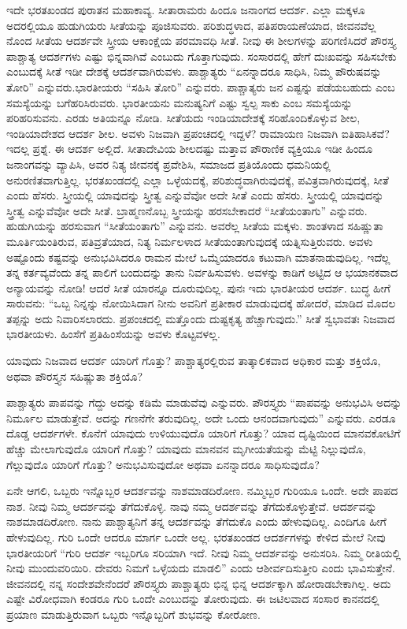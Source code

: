 ಇದೇ ಭರತಖಂಡದ ಪುರಾತನ ಮಹಾಕಾವ್ಯ. ಸೀತಾರಾಮರು ಹಿಂದೂ ಜನಾಂಗದ ಆದರ್ಶ. ಎಲ್ಲಾ ಮಕ್ಕಳೂ ಅದರಲ್ಲಿಯೂ ಹುಡುಗಿಯರು ಸೀತೆಯನ್ನು ಪೂಜಿಸುವರು. ಪರಿಶುದ್ಧಳಾದ, ಪತಿಪರಾಯಣೆಯಾದ, ಜೀವನವೆಲ್ಲ ನೊಂದ ಸೀತೆಯ ಆದರ್ಶವೇ ಸ್ತ್ರೀಯ ಆಕಾಂಕ್ಷೆಯ ಪರಮಾವಧಿ ಸೀತೆ. ನೀವು ಈ ಶೀಲಗಳನ್ನು ಪರಿಗಣಿಸಿದರೆ ಪೌರಸ್ತ್ಯ ಪಾಶ್ಚಾತ್ಯ ಆದರ್ಶಗಳು ಎಷ್ಟು ಭಿನ್ನವಾಗಿವೆ ಎಂಬುದು ಗೊತ್ತಾಗುವುದು. ಸಂಸಾರದಲ್ಲಿ ಹೇಗೆ ದುಃಖವನ್ನು ಸಹಿಸಬೇಕು ಎಂಬುದಕ್ಕೆ ಸೀತೆ ಇಡೀ ದೇಶಕ್ಕೆ ಆದರ್ಶವಾಗಿರುವಳು. ಪಾಶ್ಚಾತ್ಯರು “ಏನನ್ನಾದರೂ ಸಾಧಿಸಿ, ನಿಮ್ಮ ಪೌರುಷವನ್ನು ತೋರಿ” ಎನ್ನುವರು.\break ಭಾರತೀಯರು “ಸಹಿಸಿ ತೋರಿ” ಎನ್ನುವರು. ಪಾಶ್ಚಾತ್ಯರು ಜನ ಎಷ್ಟನ್ನು ಪಡೆಯಬಹುದು ಎಂಬ ಸಮಸ್ಯೆಯನ್ನು ಬಗೆಹರಿಸಿರುವರು. ಭಾರತೀಯನು ಮನುಷ್ಯನಿಗೆ ಎಷ್ಟು ಸ್ವಲ್ಪ ಸಾಕು ಎಂಬ ಸಮಸ್ಯೆಯನ್ನು ಪರಿಹರಿಸುವನು. ಎರಡು ಅತಿಯನ್ನೂ ನೋಡಿ. ಸೀತೆಯದು ಇಂಡಿಯಾದೇಶಕ್ಕೆ ಸರಿಹೊಂದಿಕೊಳ್ಳುವ ಶೀಲ, ಇಂಡಿಯಾದೇಶದ ಆದರ್ಶ ಶೀಲ. ಅವಳು ನಿಜವಾಗಿ ಪ್ರಪಂಚದಲ್ಲಿ ಇದ್ದಳೆ? ರಾಮಾಯಣ ನಿಜವಾಗಿ ಐತಿಹಾಸಿಕವೆ? ಇದಲ್ಲ ಪ್ರಶ್ನೆ. ಈ ಆದರ್ಶ ಅಲ್ಲಿದೆ. ಸೀತಾದೇವಿಯ ಶೀಲದಷ್ಟು ಮತ್ತಾವ ಪೌರಾಣಿಕ ವ್ಯಕ್ತಿಯೂ ಇಡೀ ಹಿಂದೂ ಜನಾಂಗವನ್ನು ವ್ಯಾಪಿಸಿ, ಅವರ ನಿತ್ಯ ಜೀವನಕ್ಕೆ ಪ್ರವೇಶಿಸಿ, ಸಮಾಜದ ಪ್ರತಿಯೊಂದು ಧಮನಿಯಲ್ಲಿ ಅನುರಣಿತವಾಗುತ್ತಿಲ್ಲ. ಭರತಖಂಡದಲ್ಲಿ ಎಲ್ಲಾ ಒಳ್ಳೆಯದಕ್ಕೆ, ಪರಿಶುದ್ಧವಾಗಿರುವುದಕ್ಕೆ, ಪವಿತ್ರವಾಗಿರುವುದಕ್ಕೆ, ಸೀತೆ ಎಂದು ಹೆಸರು. ಸ್ತ್ರೀಯಲ್ಲಿ ಯಾವುದನ್ನು ಸ್ತ್ರೀತ್ವ ಎನ್ನುವೆವೋ ಅದೇ ಸೀತೆ ಎಂದು ಹೆಸರು. ಸ್ತ್ರೀಯಲ್ಲಿ ಯಾವುದನ್ನು ಸ್ತ್ರೀತ್ವ ಎನ್ನುವೆವೋ ಅದೇ ಸೀತೆ. ಬ್ರಾಹ್ಮಣನೊಬ್ಬ ಸ್ತ್ರೀಯನ್ನು ಹರಸಬೇಕಾದರೆ “ಸೀತೆಯಂತಾಗು” ಎನ್ನುವರು. ಹುಡುಗಿಯನ್ನು ಹರಸುವಾಗ “ಸೀತೆಯಂತಾಗು” ಎನ್ನುವನು. ಅವರೆಲ್ಲ ಸೀತೆಯ ಮಕ್ಕಳು. ಶಾಂತಳಾದ ಸಹಿಷ್ಣುತಾ ಮೂರ್ತಿಯಂತಿರುವ, ಪತಿವ್ರತೆಯಾದ, ನಿತ್ಯ ನಿರ್ಮಲಳಾದ ಸೀತೆಯಂತಾಗುವುದಕ್ಕೆ ಯತ್ನಿಸುತ್ತಿರುವರು. ಅವಳು ಅಷ್ಟೊಂದು ಕಷ್ಟವನ್ನು ಅನುಭವಿಸಿದರೂ ರಾಮನ ಮೇಲೆ ಒಮ್ಮೆಯಾದರೂ ಕಟುವಾಗಿ ಮಾತನಾಡುವುದಿಲ್ಲ. ಇದೆಲ್ಲ ತನ್ನ ಕರ್ತವ್ಯವೆಂದು ತನ್ನ ಪಾಲಿಗೆ ಬಂದುದನ್ನು ತಾನು ನಿರ್ವಹಿಸುವಳು. ಅವಳನ್ನು ಕಾಡಿಗೆ ಅಟ್ಟಿದ ಆ ಭಯಾನಕವಾದ ಅನ್ಯಾಯವನ್ನು ನೋಡಿ! ಆದರೆ ಸೀತೆ ಯಾರನ್ನೂ ದೂರುವುದಿಲ್ಲ. ಪುನಃ ಇದು ಭಾರತೀಯರ ಆದರ್ಶ. ಬುದ್ಧ ಹೀಗೆ ಸಾರುವನು: “ಒಬ್ಬ ನಿನ್ನನ್ನು ನೋಯಿಸಿದಾಗ ನೀನು ಅವನಿಗೆ ಪ್ರತೀಕಾರ ಮಾಡುವುದಕ್ಕೆ ಹೋದರೆ, ಮಾಡಿದ ಮೊದಲ ತಪ್ಪನ್ನು ಅದು ನಿವಾರಿಸಲಾರದು. ಪ್ರಪಂಚದಲ್ಲಿ ಮತ್ತೊಂದು ದುಷ್ಟಕೃತ್ಯ ಹೆಚ್ಚಾಗುವುದು.” ಸೀತೆ ಸ್ವಭಾವತಃ ನಿಜವಾದ ಭಾರತೀಯಳು. ಹಿಂಸೆಗೆ ಪ್ರತಿಹಿಂಸೆಯನ್ನು ಅವಳು ಕೊಟ್ಟವಳಲ್ಲ.

ಯಾವುದು ನಿಜವಾದ ಆದರ್ಶ ಯಾರಿಗೆ ಗೊತ್ತು? ಪಾಶ್ಚಾತ್ಯರಲ್ಲಿರುವ ತಾತ್ಕಾಲಿಕವಾದ ಅಧಿಕಾರ ಮತ್ತು ಶಕ್ತಿಯೊ, ಅಥವಾ ಪೌರಸ್ತ್ಯನ ಸಹಿಷ್ಣುತಾ ಶಕ್ತಿಯೊ?

ಪಾಶ್ಚಾತ್ಯರು ಪಾಪವನ್ನು ಗೆದ್ದು ಅದನ್ನು ಕಡಿಮೆ ಮಾಡುವೆವು ಎನ್ನುವರು. ಪೌರಸ್ತ್ಯರು “ಪಾಪವನ್ನು ಅನುಭವಿಸಿ ಅದನ್ನು ನಿರ್ಮೂಲ ಮಾಡುತ್ತೇವೆ. ಅದನ್ನು ಗಣನೆಗೇ ತರುವುದಿಲ್ಲ. ಅದೇ ಒಂದು ಆನಂದವಾಗುವುದು” ಎನ್ನುವರು. ಎರಡೂ ದೊಡ್ಡ ಆದರ್ಶಗಳೇ. ಕೊನೆಗೆ ಯಾವುದು ಉಳಿಯುವುದೊ ಯಾರಿಗೆ ಗೊತ್ತು? ಯಾವ ದೃಷ್ಟಿಯಿಂದ ಮಾನವಕೋಟಿಗೆ ಹೆಚ್ಚು ಮೇಲಾಗುವುದೊ ಯಾರಿಗೆ ಗೊತ್ತು? ಯಾವುದು ಮಾನವನ ಮೃಗೀಯತೆಯನ್ನು ಮೆಟ್ಟಿ ನಿಲ್ಲುವುದೊ, ಗೆಲ್ಲುವುದೊ ಯಾರಿಗೆ ಗೊತ್ತು? ಅನುಭವಿಸುವುದೋ ಅಥವಾ ಏನನ್ನಾದರೂ ಸಾಧಿಸುವುದೊ?

ಏನೇ ಆಗಲಿ, ಒಬ್ಬರು ಇನ್ನೊಬ್ಬರ ಆದರ್ಶವನ್ನು ನಾಶಮಾಡದಿರೋಣ. ನಮ್ಮಿಬ್ಬರ ಗುರಿಯೂ ಒಂದೇ. ಅದೇ ಪಾಪದ ನಾಶ. ನೀವು ನಿಮ್ಮ ಆದರ್ಶವನ್ನು ತೆಗೆದುಕೊಳ್ಳಿ. ನಾವು ನಮ್ಮ ಆದರ್ಶವನ್ನು ತೆಗೆದುಕೊಳ್ಳುತ್ತೇವೆ. ಆದರ್ಶವನ್ನು ನಾಶಮಾಡದಿರೋಣ. ನಾನು ಪಾಶ್ಚಾತ್ಯನಿಗೆ ತನ್ನ ಆದರ್ಶವನ್ನು ತೆಗೆದುಕೊ ಎಂದು ಹೇಳುವುದಿಲ್ಲ. ಎಂದಿಗೂ ಹೀಗೆ ಹೇಳುವುದಿಲ್ಲ. ಗುರಿ ಒಂದೇ ಆದರೂ ಮಾರ್ಗ ಒಂದೇ ಅಲ್ಲ. ಭರತಖಂಡದ ಆದರ್ಶಗಳನ್ನು ಕೇಳಿದ ಮೇಲೆ ನೀವು ಭಾರತೀಯರಿಗೆ “ಗುರಿ ಆದರ್ಶ ಇಬ್ಬರಿಗೂ ಸರಿಯಾಗಿ ಇದೆ. ನೀವು ನಿಮ್ಮ ಆದರ್ಶವನ್ನು ಅನುಸರಿಸಿ. ನಿಮ್ಮ ರೀತಿಯಲ್ಲಿ ನೀವು ಮುಂದುವರಿಯಿರಿ. ದೇವರು ನಿಮಗೆ ಒಳ್ಳೆಯದು ಮಾಡಲಿ” ಎಂದು ಆಶೀರ್ವದಿಸುತ್ತೀರಿ ಎಂದು ಭಾವಿಸುತ್ತೇನೆ. ಜೀವನದಲ್ಲಿ ನನ್ನ ಸಂದೇಶವೇನೆಂದರೆ ಪೌರಸ್ತ್ಯರು ಪಾಶ್ಚಾತ್ಯರು ಭಿನ್ನ ಭಿನ್ನ ಆದರ್ಶಕ್ಕಾಗಿ ಹೋರಾಡಬೇಕಾಗಿಲ್ಲ. ಅದು ಎಷ್ಟೇ ವಿರೋಧವಾಗಿ ಕಂಡರೂ ಗುರಿ ಒಂದೇ ಎಂಬುದನ್ನು ತೋರುವುದು. ಈ ಜಟಿಲವಾದ ಸಂಸಾರ ಕಾನನದಲ್ಲಿ ಪ್ರಯಾಣ ಮಾಡುತ್ತಿರುವಾಗ ಒಬ್ಬರು ಇನ್ನೊಬ್ಬರಿಗೆ ಶುಭವನ್ನು ಕೋರೋಣ.


